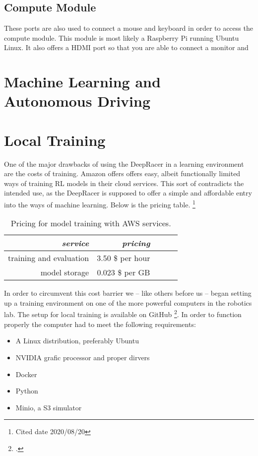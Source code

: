 \subsection{Compute Module}
These ports are also used to connect a mouse and keyboard in order to access the compute module. This module is most likely a Raspberry Pi running Ubuntu Linux. It also offers a HDMI port so that you are able to connect a monitor and

\section{Machine Learning and Autonomous Driving}


 \section{Local Training}
 
 One of the major drawbacks of using the DeepRacer in a learning environment are the costs of training. Amazon offers offers easy, albeit functionally limited ways of training RL models in their cloud services. This sort of contradicts the intended use, as the DeepRacer is supposed to offer a simple and affordable entry into the ways of machine learning. Below is the pricing table. \footnote{Cited date 2020/08/20}
 \begin{table}
 \caption{Pricing for model training with AWS services.}
 \label{tab:services}
 \centering
 \setlength{\tabcolsep}{5mm}
 \def\arraystretch{1.25}
 \begin{tabular}{|r|r|c|c|c|}
 \emph{service} & \emph{pricing} \\
 \hline\hline
 training and evaluation & 3.50 \$ per hour \\
 \hline
 model storage & 0.023 \$ per GB \\
 \hline
 \end{tabular}
 \end{table}
 In order to circumvent this cost barrier we -- like others before us -- began setting up a training environment on one of the more powerful computers in the robotics lab.
 The setup for local training is available on GitHub \footcite{https://github.com/aws-deepracer-community/deepracer}. In order to function properly the computer had to meet the following requirements:
 \begin{itemize}
 \item A Linux distribution, preferably Ubuntu
 \item NVIDIA grafic processor and proper dirvers
 \item Docker
 \item Python
 \item Minio, a S3 simulator
 \end{itemize}